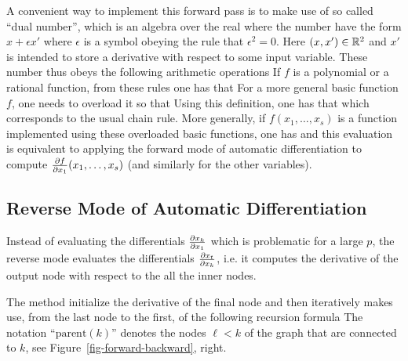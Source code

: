 A convenient way to implement this forward pass is to make use of so called ``dual number'', which is an algebra over the real  where the number have the form $x + \epsilon x'$ where $\epsilon$ is a symbol obeying the rule that $\epsilon^2=0$. Here $(x,x') \in \mathbb{R}^2$ and $x'$ is intended to store a derivative with respect to some input variable. These number thus obeys the following arithmetic operations
If $f$ is a polynomial or a rational function, from these rules one has that 
For a more general basic function $f$, one needs to overload it so that
Using this definition, one has that 
which corresponds to the usual chain rule. More generally, if $f(x_1,\ldots,x_s)$ is a function implemented using these overloaded basic functions, one has  
and this evaluation is equivalent to applying the forward mode of automatic differentiation to compute $\frac{ \partial f}{\partial x_1}(x_1,\ldots,x_s)$ (and similarly for the other variables).


\subsection{Reverse Mode of Automatic Differentiation}

Instead of evaluating the differentials $\frac{ \partial x_k}{\partial x_1}$ which is problematic for a large $p$, the reverse mode evaluates the differentials  $\frac{ \partial x_t}{\partial x_k}$, i.e. it computes the derivative of the output node with respect to the all the inner nodes. 



The method initialize the derivative of the final node
and then iteratively makes use,  from the last node to the first, of the following recursion formula
%
The notation ``$\text{parent}(k)$'' denotes the nodes $\ell<k$ of the graph that are connected to $k$, see Figure~\ref{fig-forward-backward}, right. 

